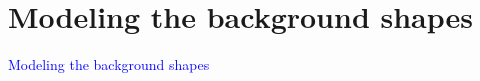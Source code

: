 \documentclass[compress]{beamer}
\begin{document}
\begin{frame}
\begin{columns}
\end{columns}
\end{frame}

\section*{Modeling the background shapes}
\begin{frame}
\begin{center}
\Huge \textcolor{blue}{Modeling the background shapes}
\end{center}
\end{frame}
\end{document}
